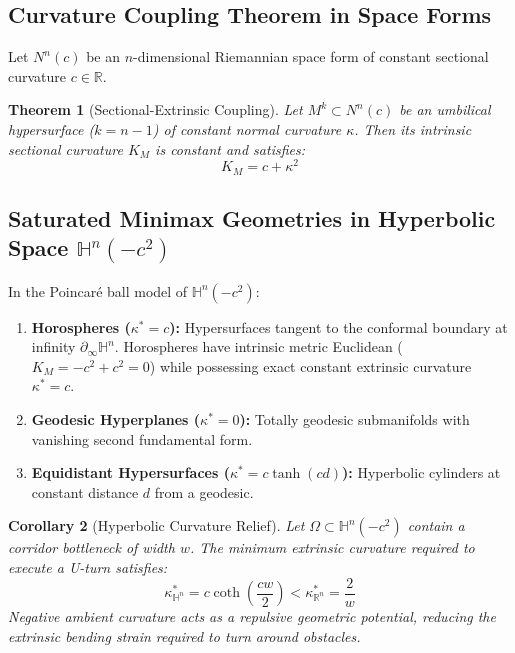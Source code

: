 \documentclass[11pt,reqno]{amsart}
\newtheorem{theorem}{Theorem}[section]
\newtheorem{corollary}[theorem]{Corollary}
\theoremstyle{definition}
\providecommand{\R}{\mathbb{R}}
\providecommand{\Hyp}{\mathbb{H}}
\numberwithin{equation}{section}
\providecommand{\Hyp}{\mathbb{H}}
\providecommand{\R}{\mathbb{R}}
\begin{document}
\subsection{Curvature Coupling Theorem in Space Forms}
Let $N^n(c)$ be an $n$-dimensional Riemannian space form of constant sectional curvature $c \in \R$.
\begin{theorem}[Sectional-Extrinsic Coupling]
Let $M^k \subset N^n(c)$ be an umbilical hypersurface ($k = n-1$) of constant normal curvature $\kappa$. Then its intrinsic sectional curvature $K_M$ is constant and satisfies:
\begin{equation}
K_M = c + \kappa^2
\end{equation}
\end{theorem}

\subsection{Saturated Minimax Geometries in Hyperbolic Space \texorpdfstring{$\Hyp^n(-c^2)$}{H\textasciicircum n(-c\textasciicircum 2)}}
In the Poincar\'e ball model of $\Hyp^n(-c^2)$:
\begin{enumerate}
    \item \textbf{Horospheres ($\kappa^* = c$):} Hypersurfaces tangent to the conformal boundary at infinity $\partial_\infty \Hyp^n$. Horospheres have intrinsic metric Euclidean ($K_M = -c^2 + c^2 = 0$) while possessing exact constant extrinsic curvature $\kappa^* = c$.
    \item \textbf{Geodesic Hyperplanes ($\kappa^* = 0$):} Totally geodesic submanifolds with vanishing second fundamental form.
    \item \textbf{Equidistant Hypersurfaces ($\kappa^* = c \tanh(c d)$):} Hyperbolic cylinders at constant distance $d$ from a geodesic.
\end{enumerate}

\begin{corollary}[Hyperbolic Curvature Relief]
Let $\Omega \subset \Hyp^n(-c^2)$ contain a corridor bottleneck of width $w$. The minimum extrinsic curvature required to execute a U-turn satisfies:
\begin{equation}
\kappa^*_{\Hyp^n} = c \coth\left(\frac{c w}{2}\right) < \kappa^*_{\R^n} = \frac{2}{w}
\end{equation}
Negative ambient curvature acts as a repulsive geometric potential, reducing the extrinsic bending strain required to turn around obstacles.
\end{corollary}
\end{document}
